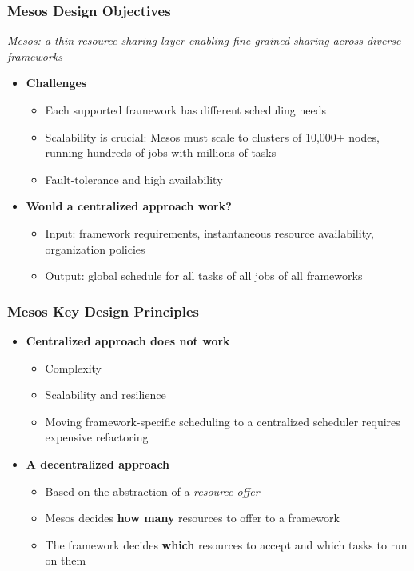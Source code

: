 \begin{frame}
\frametitle{Mesos Design Objectives}
{\it Mesos: a thin resource sharing layer enabling fine-grained sharing across diverse frameworks}

\vspace{20pt}

\begin{itemize}
	\item {\bf Challenges}
	\begin{itemize}
		\item Each supported framework has different scheduling needs
		\item Scalability is crucial: Mesos must scale to clusters of 10,000+ nodes, running hundreds of jobs with millions of tasks
		\item Fault-tolerance and high availability
	\end{itemize}

\vspace{20pt}

	\item {\bf Would a centralized approach work?}
	\begin{itemize}
		\item Input: framework requirements, instantaneous resource availability, organization policies
		\item Output: global schedule for all tasks of all jobs of all frameworks
	\end{itemize}
\end{itemize}
\end{frame}

\begin{frame}
\frametitle{Mesos Key Design Principles}
\begin{itemize}
	\item {\bf Centralized approach does not work}
	\begin{itemize}
		\item Complexity
		\item Scalability and resilience
		\item Moving framework-specific scheduling to a centralized scheduler requires expensive refactoring
	\end{itemize}

\vspace{20pt}

	\item {\bf A decentralized approach}
	\begin{itemize}
		\item Based on the abstraction of a {\it resource offer}
		\item Mesos decides {\bf how many} resources to offer to a framework
		\item The framework decides {\bf which} resources to accept and which tasks to run on them
	\end{itemize}
\end{itemize}
\end{frame}

